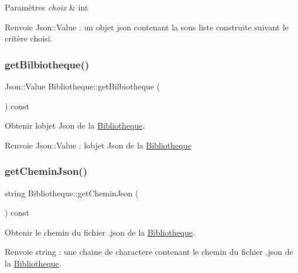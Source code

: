 \begin{DoxyParams}{Paramètres}
{\em choix} & int \\
\hline
\end{DoxyParams}
\begin{DoxyReturn}{Renvoie}
Json\+::\+Value \+: un objet json contenant la sous liste construite suivant le critère choisi. 
\end{DoxyReturn}
\mbox{\label{classBibliotheque_a24b9cdc62d7bf2628e13ac9049dccaf3}} 
\subsubsection{\texorpdfstring{get\+Bilbiotheque()}{getBilbiotheque()}}
{\footnotesize\ttfamily Json\+::\+Value Bibliotheque\+::get\+Bilbiotheque (\begin{DoxyParamCaption}{ }\end{DoxyParamCaption}) const}



Obtenir l\textquotesingle{}objet Json de la \hyperlink{classBibliotheque}{Bibliotheque}. 

\begin{DoxyReturn}{Renvoie}
Json\+::\+Value \+: l\textquotesingle{}objet Json de la \hyperlink{classBibliotheque}{Bibliotheque} 
\end{DoxyReturn}
\mbox{\label{classBibliotheque_ace0c63ec27d7adfb7146406769f1a051}} 
\subsubsection{\texorpdfstring{get\+Chemin\+Json()}{getCheminJson()}}
{\footnotesize\ttfamily string Bibliotheque\+::get\+Chemin\+Json (\begin{DoxyParamCaption}{ }\end{DoxyParamCaption}) const}



Obtenir le chemin du fichier .json de la \hyperlink{classBibliotheque}{Bibliotheque}. 

\begin{DoxyReturn}{Renvoie}
string \+: une chaine de charactere contenant le chemin du fichier .json de la \hyperlink{classBibliotheque}{Bibliotheque}. 
\end{DoxyReturn}
\mbox{\label{classBibliotheque_a61778c23eb938c95b4de4306c14fe754}} 
